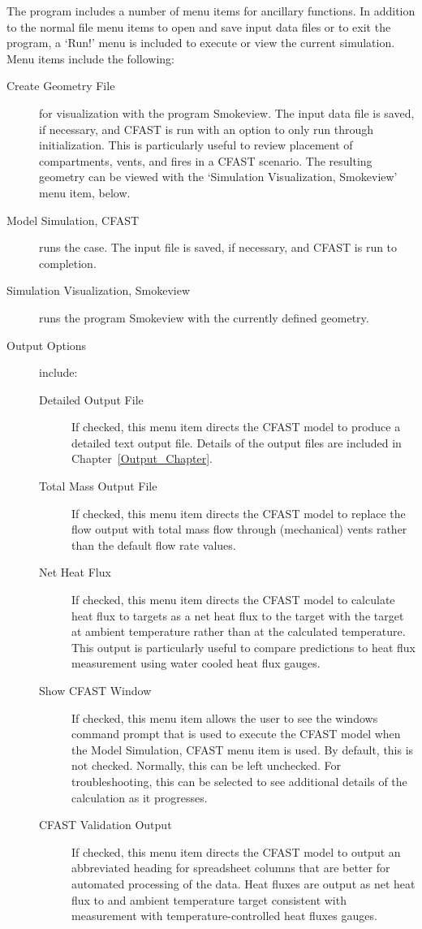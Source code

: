 The program includes a number of menu items for ancillary functions.  In addition to the normal file menu items to open and save input data files or to exit the program, a `Run!' menu is included to execute or view the current simulation. Menu items include the following:
\begin{description}
\item[Create Geometry File] for visualization with the program Smokeview.  The input data file is saved, if necessary, and CFAST is run with an option to only run through initialization. This is particularly useful to review placement of compartments, vents, and fires in a CFAST scenario. The resulting geometry can be viewed with the `Simulation Visualization, Smokeview' menu item, below.
\item[Model Simulation, CFAST] runs the case. The input file is saved, if necessary, and CFAST is run to completion.
\item[Simulation Visualization, Smokeview] runs the program Smokeview with the currently defined geometry.
\item[Output Options] include:
\begin{description}
\item[Detailed Output File] If checked, this menu item directs the CFAST model to produce a detailed text output file.  Details of the output files are included in Chapter~\ref{Output_Chapter}.
\item[Total Mass Output File] If checked, this menu item directs the CFAST model to replace the flow output with total mass flow through (mechanical) vents rather than the default flow rate values.
\item[Net Heat Flux]  If checked, this menu item directs the CFAST model to calculate heat flux to targets as a net heat flux to the target with the target at ambient temperature rather than at the calculated temperature.  This output is particularly useful to compare predictions to heat flux measurement using water cooled heat flux gauges.
\item[Show CFAST Window] If checked, this menu item allows the user to see the windows command prompt that is used to execute the CFAST model when the Model Simulation, CFAST menu item is used.  By default, this is not checked.  Normally, this can be left unchecked.  For troubleshooting, this can be selected to see additional details of the calculation as it progresses.
\item[CFAST Validation Output] If checked, this menu item directs the CFAST model to output an abbreviated heading for spreadsheet columns that are better for automated processing of the data. Heat fluxes are output as net heat flux to and ambient temperature target consistent with measurement with temperature-controlled heat fluxes gauges.
\end{description}
\end{description}


